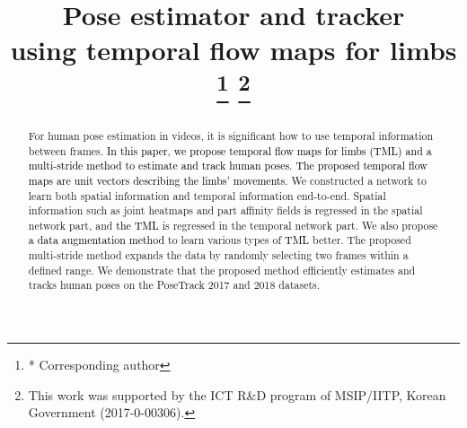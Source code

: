 \documentclass[conference]{IEEEtran}
\begin{document}
\newcommand\nj[1]{\textcolor{black}{#1}} 
\newcommand\knj[1]{\textcolor{black}{#1}} 
\newcommand\jin[1]{\textcolor{black}{#1}}
\newcommand\sh[1]{\textcolor{black}{#1}}
\newcommand\shtwo[1]{\textcolor{black}{#1}}
\newcommand\js[1]{\textcolor{black}{#1}}
\newcommand\kjs[1]{\textcolor{black}{#1}}
\newcommand\jh[1]{\textcolor{black}{#1}}
\newcommand\kjh[1]{\textcolor{black}{#1}}
\newcommand\je[1]{\textcolor{black}{#1}}


\title{Pose estimator and tracker \\using temporal flow maps for limbs\\
{\footnotesize 
}
\thanks{* Corresponding author}
\thanks{This work was supported by the ICT R\&D program of MSIP/IITP, Korean Government (2017-0-00306).}
}

\author{
}

\maketitle

\begin{abstract}


For human pose estimation in videos, it is significant how to use temporal information between frames. \jh{In this paper, we propose temporal \jin{flow} maps \jh{for limbs (TML)} and a multi-stride method to estimate and track human poses.} \jh{The proposed temporal \jin{flow} maps \jin{are} unit vectors describing the limbs' movements.}
We constructed a network to learn both spatial information and temporal information end-to-end. Spatial information such as joint heatmaps and part affinity fields \jin{is} regressed in the spatial network part, and \jh{the TML} is regressed in the temporal network part. We also propose \shtwo{a data augmentation method
}to learn various types of 
\jh{TML }better. The proposed multi-stride method expands the data by randomly selecting two frames within a defined range. We demonstrate that the proposed method efficiently estimates and tracks human poses on the PoseTrack 2017 and 2018 datasets.


\end{abstract}
\end{document}
